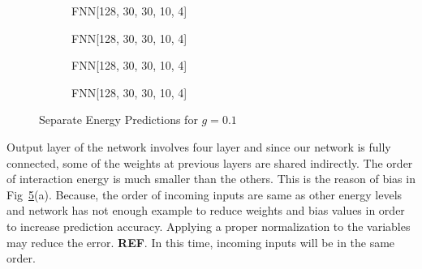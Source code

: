 \documentclass[a4paper,times,12pt]{article}
\begin{document}
\begin{figure}[H]
    \centering
    \begin{subfigure}[t]{0.45\textwidth}
		\centering
        
        \caption{FNN[128, 30, 30, 10, 4]}
		\label{fig:a}
    \end{subfigure}
    \begin{subfigure}[t]{0.45\textwidth}
		\centering
        
        \caption{FNN[128, 30, 30, 10, 4]}
		\label{fig:b}
    \end{subfigure}    
    \begin{subfigure}[t]{0.45\textwidth}
        \centering
        
        \caption{FNN[128, 30, 30, 10, 4]}
		\label{fig:c}
    \end{subfigure}
    \begin{subfigure}[t]{0.45\textwidth}
        \centering
        
        \caption{FNN[128, 30, 30, 10, 4]}
		\label{fig:c}
    \end{subfigure}
	\caption{Separate Energy Predictions for $g = 0.1$ }
\label{fig:FFN-g-0.1-S}
\end{figure}


Output layer of the network involves four layer and since our network is fully connected, some of the weights at previous layers are shared indirectly. The order of interaction energy is much smaller than the others. This is the reason of bias in Fig~\ref{fig:FFN-g-0.1-S}(a). Because, the order of incoming inputs are same as other energy levels and network has not enough example to reduce weights and bias values in order to increase prediction accuracy. Applying a proper normalization to the variables may reduce the error. \textbf{REF}. In this time, incoming inputs will be in the same order.
\end{document}
